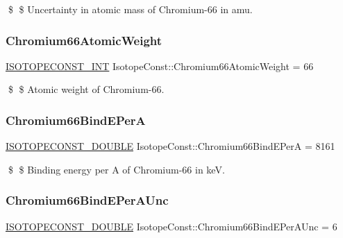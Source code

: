 \$ \$ Uncertainty in atomic mass of Chromium-\/66 in amu. \mbox{\label{group___isotope_const-_chromium-_cr66_ga3d172637c0b2832baf92038cb015a515}} 
\subsubsection{\texorpdfstring{Chromium66\+Atomic\+Weight}{Chromium66AtomicWeight}}
{\footnotesize\ttfamily \mbox{\hyperlink{group___isotope_const-_macros_ga5f18360b3e99483a35c32d789e62621c}{I\+S\+O\+T\+O\+P\+E\+C\+O\+N\+S\+T\+\_\+\+I\+NT}} Isotope\+Const\+::\+Chromium66\+Atomic\+Weight = 66}

\$ \$ Atomic weight of Chromium-\/66. \mbox{\label{group___isotope_const-_chromium-_cr66_ga4bac3de51861a4856bf63601aa023955}} 
\subsubsection{\texorpdfstring{Chromium66\+Bind\+E\+PerA}{Chromium66BindEPerA}}
{\footnotesize\ttfamily \mbox{\hyperlink{group___isotope_const-_macros_ga8f45a7272ce02c0b4c65c44636ed719a}{I\+S\+O\+T\+O\+P\+E\+C\+O\+N\+S\+T\+\_\+\+D\+O\+U\+B\+LE}} Isotope\+Const\+::\+Chromium66\+Bind\+E\+PerA = 8161}

\$ \$ Binding energy per A of Chromium-\/66 in keV. \mbox{\label{group___isotope_const-_chromium-_cr66_ga4778721aaf22c66b6e4eb22fdd516321}} 
\subsubsection{\texorpdfstring{Chromium66\+Bind\+E\+Per\+A\+Unc}{Chromium66BindEPerAUnc}}
{\footnotesize\ttfamily \mbox{\hyperlink{group___isotope_const-_macros_ga8f45a7272ce02c0b4c65c44636ed719a}{I\+S\+O\+T\+O\+P\+E\+C\+O\+N\+S\+T\+\_\+\+D\+O\+U\+B\+LE}} Isotope\+Const\+::\+Chromium66\+Bind\+E\+Per\+A\+Unc = 6}

